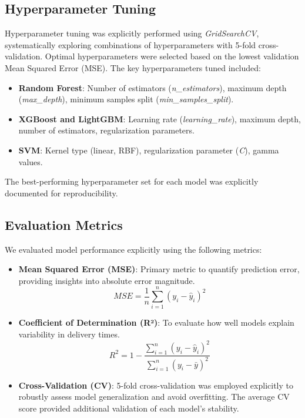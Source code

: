 \documentclass[10pt,twocolumn,letterpaper]{article}
\begin{document}
\subsection{Hyperparameter Tuning}
Hyperparameter tuning was explicitly performed using \textit{GridSearchCV}, systematically exploring combinations of hyperparameters with 5-fold cross-validation. Optimal hyperparameters were selected based on the lowest validation Mean Squared Error (MSE). The key hyperparameters tuned included:

\begin{itemize}
    \item \textbf{Random Forest}: Number of estimators (\textit{n\_estimators}), maximum depth (\textit{max\_depth}), minimum samples split (\textit{min\_samples\_split}).
    \item \textbf{XGBoost and LightGBM}: Learning rate (\textit{learning\_rate}), maximum depth, number of estimators, regularization parameters.
    \item \textbf{SVM}: Kernel type (linear, RBF), regularization parameter (\textit{C}), gamma values.
\end{itemize}

The best-performing hyperparameter set for each model was explicitly documented for reproducibility.

\subsection{Evaluation Metrics}
We evaluated model performance explicitly using the following metrics:

\begin{itemize}
    \item \textbf{Mean Squared Error (MSE)}: Primary metric to quantify prediction error, providing insights into absolute error magnitude.
    \begin{equation}
        MSE = \frac{1}{n}\sum_{i=1}^{n}(y_i - \hat{y}_i)^2
    \end{equation}

    \item \textbf{Coefficient of Determination (R²)}: To evaluate how well models explain variability in delivery times.
    \begin{equation}
        R^2 = 1 - \frac{\sum_{i=1}^{n}(y_i - \hat{y}_i)^2}{\sum_{i=1}^{n}(y_i - \bar{y})^2}
    \end{equation}

    \item \textbf{Cross-Validation (CV)}: 5-fold cross-validation was employed explicitly to robustly assess model generalization and avoid overfitting. The average CV score provided additional validation of each model's stability.
\end{itemize}
\end{document}
